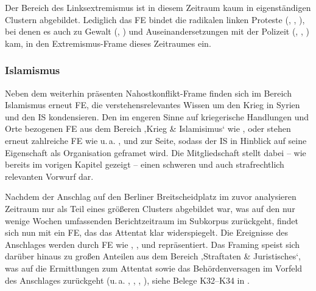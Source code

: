 Der Bereich des Linksextremismus ist in diesem Zeitraum kaum in eigenständigen Clustern abgebildet. Lediglich das FE  bindet die radikalen linken Proteste (, , ), bei denen es auch zu Gewalt (, ) und Auseinandersetzungen mit der Polizeit (, , ) kam, in den Extremismus-Frame dieses Zeitraumes ein.

\subsubsection{Islamismus}\label{islamismus-6}

Neben dem weiterhin präsenten Nahostkonflikt-Frame finden sich im Bereich Islamismus erneut FE, die verstehensrelevantes Wissen um den Krieg in Syrien und den IS kondensieren. Den im engeren Sinne auf kriegerische Handlungen und Orte bezogenen FE aus dem Bereich ‚Krieg \& Islamisimus` wie ,  oder  stehen erneut zahlreiche FE wie u.\,a. ,  und  zur Seite, sodass der IS in Hinblick auf seine Eigenschaft als Organisation geframet wird. Die Mitgliedschaft stellt dabei -- wie bereits im vorigen Kapitel gezeigt -- einen schweren und auch strafrechtlich relevanten Vorwurf dar.

Nachdem der Anschlag auf den Berliner Breitscheidplatz im zuvor analysieren Zeitraum nur als Teil eines größeren Clusters abgebildet war, was auf den nur wenige Wochen umfassenden Berichtzeitraum im Subkorpus zurückgeht, findet sich nun mit  ein FE, das das Attentat klar widerspiegelt. Die Ereignisse des Anschlages werden durch FE wie , ,  und  repräsentiert. Das Framing speist sich darüber hinaus zu großen Anteilen aus dem Bereich ‚Straftaten \& Juristisches`, was auf die Ermittlungen zum Attentat sowie das Behördenversagen im Vorfeld des Anschlages zurückgeht (u.\,a. , , , ), siehe Belege K32--K34 in .

